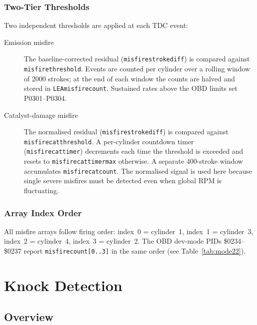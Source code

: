 \documentclass[a4paper,11pt]{article}
\renewcommand{\_}{\oldunderscore\allowbreak}
\begin{document}
\subsubsection*{Two-Tier Thresholds}

Two independent thresholds are applied at each TDC event:

\begin{description}
  \item[Emission misfire] The baseline-corrected residual
        (\texttt{misfire\_stroke\_diff\_1}) is compared against
        \texttt{misfire\_threshold}. Events are counted per cylinder over a
        rolling window of 2000 strokes; at the end of each window the counts
        are halved and stored in \texttt{LEA\_misfire\_count}. Sustained rates
        above the OBD limits set P0301--P0304.

  \item[Catalyst-damage misfire] The normalised residual
        (\texttt{misfire\_stroke\_diff\_2}) is compared against
        \texttt{misfire\_cat\_threshold}. A per-cylinder countdown timer
        (\texttt{misfire\_cat\_timer}) decrements each time the threshold is
        exceeded and resets to \texttt{misfire\_cat\_timer\_max} otherwise. A
        separate 400-stroke window accumulates \texttt{misfire\_cat\_count}.
        The normalised signal is used here because single severe misfires must
        be detected even when global RPM is fluctuating.
\end{description}

\subsubsection*{Array Index Order}

All misfire arrays follow firing order: index~0 = cylinder~1, index~1 =
cylinder~3, index~2 = cylinder~4, index~3 = cylinder~2. The OBD dev-mode PIDs
\$0234--\$0237 report \texttt{misfire\_count[0..3]} in the same order
(see Table~\ref{tab:mode22}).

\section{Knock Detection}

\subsection{Overview}
\end{document}
